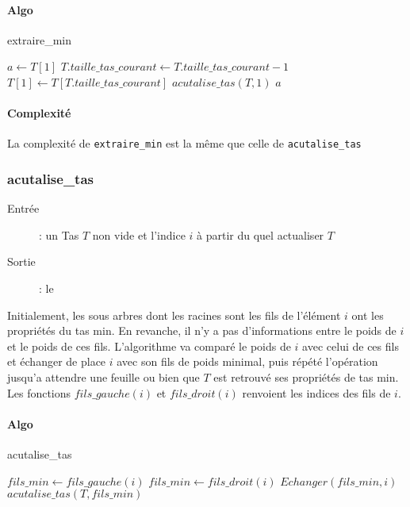 \documentclass[a4paper,11pt]{article}
\begin{document}
\paragraph*{Algo}
\begin{algorithm}
\caption{extraire\_min}
\begin{algorithmic}[1]
\STATE $a \leftarrow T\left[1\right]$
\STATE $T.taille\_tas\_courant \leftarrow T.taille\_tas\_courant - 1$
\STATE $T\left[1\right] \leftarrow T\left[T.taille\_tas\_courant\right]$
\STATE $acutalise\_tas(T, 1)$
\ENDIF
\RETURN $a$
\end{algorithmic}
\end{algorithm}
\paragraph*{Complexité}
La complexité de \texttt{extraire\_min} est la même que celle de \texttt{acutalise\_tas}
\subsubsection*{acutalise\_tas}
\begin{description}
\item[Entrée] : un \textsf{Tas} $T$ non vide et l'indice $i$ à partir du quel actualiser $T$
\item[Sortie] : le
\end{description}
Initialement, les sous arbres dont les racines sont les fils de l'élément $i$ ont les propriétés du tas min. En revanche, il n'y a pas d'informations entre le poids de $i$ et le poids de ces fils. L'algorithme va comparé le poids de $i$ avec celui de ces fils et échanger de place $i$ avec son fils de poids minimal, puis répété l'opération jusqu'a attendre une feuille ou bien que $T$ est retrouvé ses propriétés de tas min.\\
Les fonctions $fils\_gauche(i)$ et $fils\_droit(i)$ renvoient les indices des fils de $i$.
\paragraph*{Algo}
\begin{algorithm}
\caption{acutalise\_tas}
\begin{algorithmic}[1]
\STATE $fils\_min \leftarrow fils\_gauche(i)$
\ELSE
\STATE $fils\_min \leftarrow fils\_droit(i)$
\ENDIF
{}
\STATE $Echanger(fils\_min, i)$
\STATE $acutalise\_tas(T, fils\_min)$
\ENDIF
\ENDIF
\end{algorithmic}
\end{algorithm}
\end{document}
